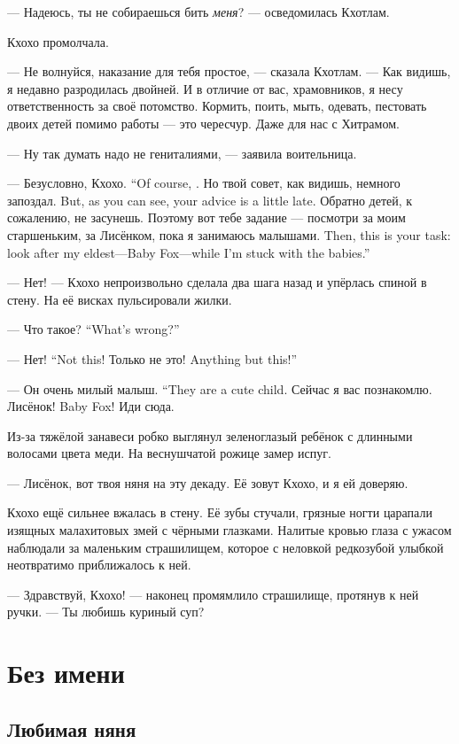 --- Надеюсь, ты не собираешься бить \emph{меня}? --- осведомилась Кхотлам.

Кхохо промолчала.

--- Не волнуйся, наказание для тебя простое, --- сказала Кхотлам.
--- Как видишь, я недавно разродилась двойней.
И в отличие от вас, храмовников, я несу ответственность за своё потомство.
Кормить, поить, мыть, одевать, пестовать двоих детей помимо работы --- это чересчур.
Даже для нас с Хитрамом.

--- Ну так думать надо не гениталиями, --- заявила воительница.

{--- Безусловно, Кхохо.}
{``Of course, \Kchoho.}
{Но твой совет, как видишь, немного запоздал.}
{But, as you can see, your advice is a little late.}
Обратно детей, к сожалению, не засунешь.
{Поэтому вот тебе задание --- посмотри за моим старшеньким, за Лисёнком, пока я занимаюсь малышами.}
{Then, this is your task: look after my eldest---Baby Fox---while I'm stuck with the babies.''}

--- Нет! --- Кхохо непроизвольно сделала два шага назад и упёрлась спиной в стену.
На её висках пульсировали жилки.

{--- Что такое?}
{``What's wrong?''}

{--- Нет!}
{``Not this!}
{Только не это!}
{Anything but this!''}

{--- Он очень милый малыш.}
{``They are a cute child.}
Сейчас я вас познакомлю.
{Лисёнок!}
{Baby Fox!}
Иди сюда.

Из-за тяжёлой занавеси робко выглянул зеленоглазый ребёнок с длинными волосами цвета меди.
На веснушчатой рожице замер испуг.

--- Лисёнок, вот твоя няня на эту декаду.
Её зовут Кхохо, и я ей доверяю.

Кхохо ещё сильнее вжалась в стену.
Её зубы стучали, грязные ногти царапали изящных малахитовых змей с чёрными глазками.
Налитые кровью глаза с ужасом наблюдали за маленьким страшилищем, которое с неловкой редкозубой улыбкой неотвратимо приближалось к ней.

--- Здравствуй, Кхохо! --- наконец промямлило страшилище, протянув к ней ручки.
--- Ты любишь куриный суп?

\chapter{Без имени}

\section{Любимая няня}

